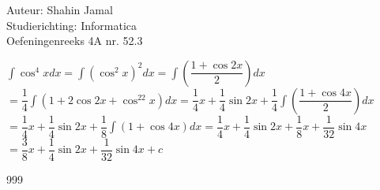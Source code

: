 \documentclass[a4paper]{article}
\begin{document}
  
\noindent \large Auteur: Shahin Jamal \\
\noindent \large Studierichting: Informatica\\
\noindent \large Oefeningenreeks 4A nr. 52.3\\

\medskip

\normalsize

$\displaystyle\int \cos^4xdx = \displaystyle\int (\cos^2x)^2dx = \displaystyle\int \left(\dfrac{1+\cos2x}{2}\right)dx$\\

$= \dfrac{1}{4}\displaystyle\int (1 + 2\cos2x + \cos^22x)dx = \dfrac{1}{4}x + \dfrac{1}{4}\sin 2x + \dfrac{1}{4}\displaystyle\int \left(\dfrac{1+\cos 4x}{2}\right) dx$\\

$= \dfrac{1}{4}x + \dfrac{1}{4}\sin 2x + \dfrac{1}{8} \displaystyle\int (1 + \cos4x) dx = \dfrac{1}{4}x + \dfrac{1}{4}\sin 2x + \dfrac{1}{8}x + \dfrac{1}{32}\sin4x$\\

$= \dfrac{3}{8}x + \dfrac{1}{4}\sin 2x + \dfrac{1}{32}\sin 4x + c$\\

\begin{thebibliography}{999}
\end{thebibliography}
\end{document}
